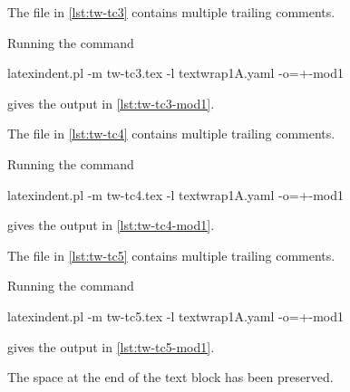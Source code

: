 \documentclass[10pt]{article}
\begin{document}
 \begin{example}
 The file in \cref{lst:tw-tc3} contains multiple trailing comments.

 Running the command

 \begin{commandshell}
latexindent.pl -m tw-tc3.tex -l textwrap1A.yaml -o=+-mod1 
\end{commandshell}

 gives the output in \cref{lst:tw-tc3-mod1}.
 \begin{cmhtcbraster}[raster column skip=.1\linewidth]
 \end{cmhtcbraster}
 \end{example}

 \begin{example}
 The file in \cref{lst:tw-tc4} contains multiple trailing comments.

 Running the command

 \begin{commandshell}
latexindent.pl -m tw-tc4.tex -l textwrap1A.yaml -o=+-mod1 
\end{commandshell}

 gives the output in \cref{lst:tw-tc4-mod1}.
 \begin{cmhtcbraster}[raster column skip=.1\linewidth]
 \end{cmhtcbraster}
 \end{example}

 \begin{example}
 The file in \cref{lst:tw-tc5} contains multiple trailing comments.

 Running the command

 \begin{commandshell}
latexindent.pl -m tw-tc5.tex -l textwrap1A.yaml -o=+-mod1 
\end{commandshell}

 gives the output in \cref{lst:tw-tc5-mod1}.
 \begin{cmhtcbraster}[raster column skip=.1\linewidth]
 \end{cmhtcbraster}
 The space at the end of the text block has been preserved.
 \end{example}
\end{document}
